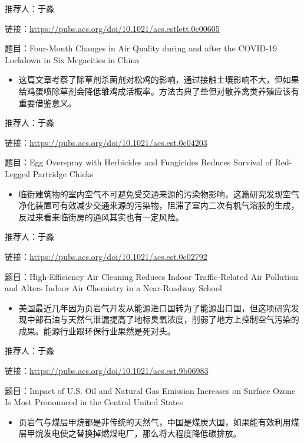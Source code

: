 \documentclass[
]{book}
\providecommand{\tightlist}{%
  \setlength{\itemsep}{0pt}\setlength{\parskip}{0pt}}
\begin{document}
推荐人：于淼

链接：\url{https://pubs.acs.org/doi/10.1021/acs.estlett.0c00605}

题目：Four-Month Changes in Air Quality during and after the COVID-19 Lockdown in Six Megacities in China

\begin{itemize}
\tightlist
\item
  这篇文章考察了除草剂杀菌剂对松鸡的影响，通过接触土壤影响不大，但如果给鸡蛋喷除草剂会降低雏鸡成活概率。方法古典了些但对散养禽类养殖应该有重要借鉴意义。
\end{itemize}

推荐人：于淼

链接：\url{https://pubs.acs.org/doi/10.1021/acs.est.0c04203}

题目：Egg Overspray with Herbicides and Fungicides Reduces Survival of Red-Legged Partridge Chicks

\begin{itemize}
\tightlist
\item
  临街建筑物的室内空气不可避免受交通来源的污染物影响，这篇研究发现空气净化装置可有效减少交通来源的污染物，阻滞了室内二次有机气溶胶的生成，反过来看来临街房的通风其实也有一定风险。
\end{itemize}

推荐人：于淼

链接：\url{https://pubs.acs.org/doi/10.1021/acs.est.0c02792}

题目：High-Efficiency Air Cleaning Reduces Indoor Traffic-Related Air Pollution and Alters Indoor Air Chemistry in a Near-Roadway School

\begin{itemize}
\tightlist
\item
  美国最近几年因为页岩气开发从能源进口国转为了能源出口国，但这项研究发现中部石油与天然气泄漏提高了地标臭氧浓度，削弱了地方上控制空气污染的成果。能源行业跟环保行业果然是死对头。
\end{itemize}

推荐人：于淼

链接：\url{https://pubs.acs.org/doi/10.1021/acs.est.9b06983}

题目：Impact of U.S. Oil and Natural Gas Emission Increases on Surface Ozone Is Most Pronounced in the Central United States

\begin{itemize}
\tightlist
\item
  页岩气与煤层甲烷都是非传统的天然气，中国是煤炭大国，如果能有效利用煤层甲烷发电使之替换掉燃煤电厂，那么将大程度降低碳排放。
\end{itemize}
\end{document}
